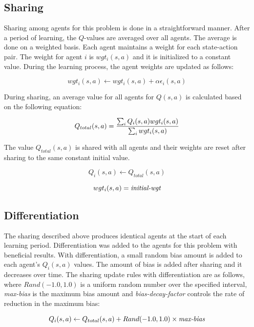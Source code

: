 \documentclass[11pt]{article} %
\begin{document}
\begin{flushleft}
\subsection{Sharing}
Sharing among agents for this problem is done in a straightforward manner.  After a period of learning, the $Q$-values are averaged over all agents.  The average is done on a weighted basis.  Each agent maintains a weight for each state-action pair.  The weight for agent $i$ is $wgt_i(s,a)$ and it is initialized to a constant value.  During the learning process, the agent weights are updated as follows:

\begin{equation}
wgt_i(s,a) \gets wgt_i(s,a)+\alpha\epsilon_i(s,a)
\end{equation}

During sharing, an average value for all agents for $Q(s,a)$ is calculated based on the following equation:

\begin{equation}
Q_{total}(s,a)={ {\sum_iQ_i(s,a)wgt_i(s,a)} \over {\sum_iwgt_i(s,a)} }
\end{equation}

The value $Q_{total}(s,a)$ is shared with all agents and their weights are reset after sharing to the same constant initial value. 

\begin{equation}
Q_i(s,a) \gets Q_{total}(s,a)
\end{equation}

\begin{equation}
wgt_i(s,a) = \mbox{\it initial-wgt}
\end{equation}

\subsection{Differentiation}
The sharing described above produces identical agents at the start of each learning period.  Differentiation was added to the agents for this problem with beneficial results.  With differentiation, a small random bias amount is added to each agent’s $Q_i(s,a)$ values.  The amount of bias is added after sharing and it decreases over time.  The sharing update rules with differentiation are as follows, where $Rand(-1.0,1.0)$ is a uniform random number over the specified interval, {\it max-bias} is the maximum bias amount and {\it bias-decay-factor} controls the rate of reduction in the maximum bias:

\begin{equation}
Q_i(s,a) \gets Q_{total}(s,a) + Rand(-1.0,1.0) \times \mbox{\it max-bias}
\end{equation}


\end{flushleft}
\end{document}
